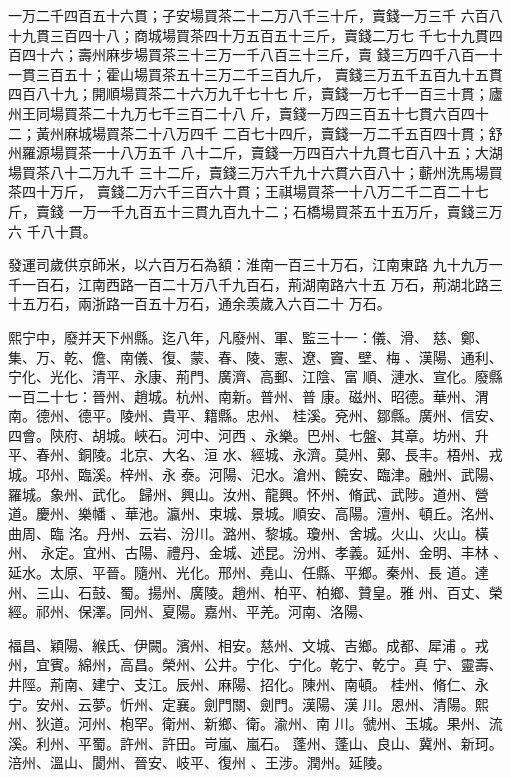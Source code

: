\documentclass{ctexart}
\begin{document}
一万二千四百五十六貫；子安場買茶二十二万八千三十斤，賣錢一万三千 六百八十九貫三百四十八；商城場買茶四十万五百五十三斤，賣錢二万七 千七十九貫四百四十六；壽州麻步場買茶三十三万一千八百三十三斤，賣 錢三万四千八百一十一貫三百五十；霍山場買茶五十三万二千三百九斤， 賣錢三万五千五百九十五貫四百八十九；開順場買茶二十六万九千七十七 斤，賣錢一万七千一百三十貫；廬州王同場買茶二十九万七千三百二十八 斤，賣錢一万四三百五十七貫六百四十二；黃州麻城場買茶二十八万四千 二百七十四斤，賣錢一万二千五百四十貫；舒州羅源場買茶一十八万五千 八十二斤，賣錢一万四百六十九貫七百八十五；大湖場買茶八十二万九千 三十二斤，賣錢三万六千九十六貫六百八十；蘄州洗馬場買茶四十万斤， 賣錢二万六千三百六十貫；王祺場買茶一十八万二千二百二十七斤，賣錢 一万一千九百五十三貫九百九十二；石橋場買茶五十五万斤，賣錢三万六 千八十貫。

發運司歲供京師米，以六百万石為額：淮南一百三十万石，江南東路 九十九万一千一百石，江南西路一百二十万八千九百石，荊湖南路六十五 万石，荊湖北路三十五万石，兩浙路一百五十万石，通余羡歲入六百二十 万石。

熙宁中，廢并天下州縣。迄八年，凡廢州、軍、監三十一：儀、滑、 慈、鄭、集、万、乾、儋、南儀、復、蒙、春、陵、憲、遼、竇、壁、梅 、漢陽、通利、宁化、光化、清平、永康、荊門、廣濟、高郵、江陰、富 順、漣水、宣化。廢縣一百二十七：晉州、趙城。杭州、南新。普州、普 康。磁州、昭德。華州、渭南。德州、德平。陵州、貴平、籍縣。忠州、 桂溪。兗州、鄒縣。廣州、信安、四會。陝府、胡城。峽石。河中、河西 、永樂。巴州、七盤、其章。坊州、升平、春州、銅陵。北京、大名、洹 水、經城、永濟。莫州、鄚、長丰。梧州、戎城。邛州、臨溪。梓州、永 泰。河陽、汜水。滄州、饒安、臨津。融州、武陽、羅城。象州、武化。 歸州、興山。汝州、龍興。怀州、脩武、武陟。道州、營道。慶州、樂幡 、華池。瀛州、束城、景城。順安、高陽。澶州、頓丘。洺州、曲周、臨 洺。丹州、云岩、汾川。潞州、黎城。瓊州、舍城。火山、火山。橫州、 永定。宜州、古陽、禮丹、金城、述昆。汾州、孝義。延州、金明、丰林 、延水。太原、平晉。隨州、光化。邢州、堯山、任縣、平鄉。秦州、長 道。達州、三山、石鼓、蜀。揚州、廣陵。趙州、柏平、柏鄉、贊皇。雅 州、百丈、榮經。祁州、保澤。同州、夏陽。嘉州、平羌。河南、洛陽、

福昌、穎陽、緱氏、伊闕。濱州、相安。慈州、文城、吉鄉。成都、犀浦 。戎州，宜賓。綿州，高昌。榮州、公井。宁化、宁化。乾宁、乾宁。真 宁、靈壽、井陘。荊南、建宁、支江。辰州、麻陽、招化。陳州、南頓。 桂州、脩仁、永宁。安州、云夢。忻州、定襄。劍門關、劍門。漢陽、漢 川。恩州、清陽。熙州、狄道。河州、枹罕。衛州、新鄉、衛。渝州、南 川。虢州、玉城。果州、流溪。利州、平蜀。許州、許田。岢嵐、嵐石。 蓬州、蓬山、良山、冀州、新珂。涪州、溫山、閬州、晉安、岐平、復州 、王涉。潤州。延陵。
\end{document}
